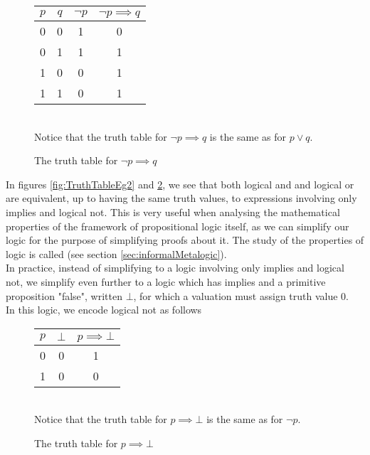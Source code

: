 \documentclass[11pt]{article}
\begin{document}
\begin{figure}[H]
    \caption{The truth table for $\neg p \implies q$}
    \label{fig:TruthTableEg3}
    \centering
    \begin{tabular}{|c|c|c|c|}
        \hline
        $p$ & $q$ & $\neg p$ & $\neg p \implies q$ \\ \hline
        0 & 0 & 1 & 0  \\
        0 & 1 & 1 & 1 \\
        1 & 0 & 0 & 1  \\
        1 & 1 & 0 & 1 \\ \hline
    \end{tabular}
    \vspace{10pt}\\ Notice that the truth table for $\neg p \implies q$ is the same as for $p \lor q$.
\end{figure}
\pagebreak
\begin{sidenote}
    In figures \ref{fig:TruthTableEg2} and \ref{fig:TruthTableEg3}, we see that both logical and and logical or are equivalent, up to having the same truth values, to expressions involving only implies and logical not. This is very useful when analysing the mathematical properties of the framework of propositional logic itself, as we can simplify our logic for the purpose of simplifying proofs about it. The study of the properties of logic is called  (see section \ref{sec:informalMetalogic}).
    \\ In practice, instead of simplifying to a logic involving only implies and logical not, we simplify even further to a logic which has implies and a primitive proposition "false", written $\bot$, for which a valuation must assign truth value 0.
    \\ In this logic, we encode logical not as follows
\begin{figure}[H]
    \caption{The truth table for $p \implies \bot$}
    \label{fig:TruthTableEg3}
    \centering
    \begin{tabular}{|c|c|c|}
        \hline
        $p$ & $\bot$ & $p \implies \bot$ \\ \hline
        0 & 0 & 1  \\
        1 & 0 & 0   \\\hline
    \end{tabular}
    \vspace{10pt}\\ Notice that the truth table for $ p \implies \bot$ is the same as for $\neg p$.
\end{figure}
\end{sidenote}
\end{document}
